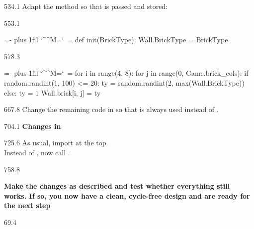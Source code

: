 \documentclass{aslab}
\makeatletter
\newcommand*\kw[1]{\textcolor{codeorange}{#1}}
\newcommand*\fn[1]{\textcolor{codecyan}{#1}}
\newcommand*\num[1]{\textcolor{codered}{#1}}
\newenvironment{pycode}{\par\ttfamily\hyphenchar\font=-1
  \lineskiplimit=-\maxdimen\lineskip=0pt\parindent=0pt
  \parfillskip=0pt plus 1fil\relax
  \catcode`\^^M=\active\catcode`\ =\active\py@setup\py@gobble}{}
\newcommand*\emo[1]{\makebox[18bp][l]{\emoji{#1}}}
\makeatother
\begin{document}
\begin{region}{534.1}
Adapt the method  so that  is passed and
stored:
\end{region}

\begin{region}[pitch=13.2]{553.1}
\begin{pycode}
\kw{def} \fn{init}(BrickType):
    Wall.BrickType = BrickType
\end{pycode}
\end{region}
\begin{region}[]{578.3}
\begin{pycode}
    \kw{for} i \kw{in} \fn{range}(\num{4}, \num{8}):
        \kw{for} j \kw{in} \fn{range}(\num{0}, Game.brick\_cols):
            \kw{if} random.randint(\num{1}, \num{100}) <= \num{20}:
                ty = random.randint(\num{2}, \fn{max}(Wall.BrickType))
            \kw{else}:
                ty = \num{1}
            Wall.brick[i, j] = ty
\end{pycode}
\end{region}

\begin{region}[pitch=13.3]{667.8}
Change the remaining code in  so that  is
always used instead of .
\end{region}

\begin{region}{704.1}
\emo{1F527}\textbf{Changes in} 
\end{region}

\begin{region}[pitch=13.5]{725.6}
As usual, import  at the top.\\
Instead of , now call .
\end{region}

\begin{region}[pitch=14.2]{758.8}
{\bfseries\color{aslabblue}Make the changes as described and test whether
everything still works. If so, you now have a clean, cycle-free design and
are ready for the next step\par}
\end{region}

\nextpage
\begin{region}{69.4}
\end{region}
\end{document}
